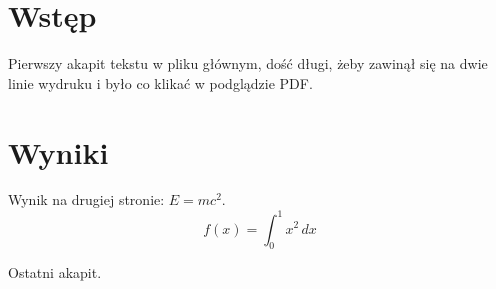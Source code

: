 \documentclass[a4paper]{article}
\begin{document}
\section{Wstęp}
Pierwszy akapit tekstu w pliku głównym, dość długi, żeby zawinął się
na dwie linie wydruku i było co klikać w podglądzie PDF.



\newpage
\section{Wyniki}
Wynik na drugiej stronie: $E = mc^2$.
\begin{equation}
  f(x) = \int_0^1 x^2\,dx
\end{equation}

Ostatni akapit.
\end{document}

